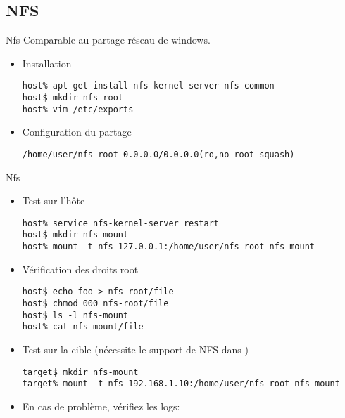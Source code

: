 \subsection{NFS}

\begin{frame}[fragile=singleslide]{Nfs}
  Comparable au partage réseau de windows.
  \begin{itemize}
  \item Installation
    \begin{lstlisting}
host% apt-get install nfs-kernel-server nfs-common
host$ mkdir nfs-root 
host% vim /etc/exports
    \end{lstlisting} %
  \item Configuration du partage
    \begin{lstlisting}
/home/user/nfs-root 0.0.0.0/0.0.0.0(ro,no_root_squash)
    \end{lstlisting}
  \end{itemize}
\end{frame}

\begin{frame}[fragile=singleslide]{Nfs}
  \begin{itemize}
    \item Test sur l'hôte
      \begin{lstlisting}
host% service nfs-kernel-server restart
host$ mkdir nfs-mount
host% mount -t nfs 127.0.0.1:/home/user/nfs-root nfs-mount
      \end{lstlisting} %
    \item Vérification des droits root
      \begin{lstlisting}
host$ echo foo > nfs-root/file
host$ chmod 000 nfs-root/file
host$ ls -l nfs-mount
host% cat nfs-mount/file
      \end{lstlisting} %
     \item Test sur la cible (nécessite le support de NFS dans )
       \begin{lstlisting}
target$ mkdir nfs-mount
target% mount -t nfs 192.168.1.10:/home/user/nfs-root nfs-mount
       \end{lstlisting} %
     \item En cas de problème, vérifiez les logs: 
   \end{itemize}
\end{frame}  

